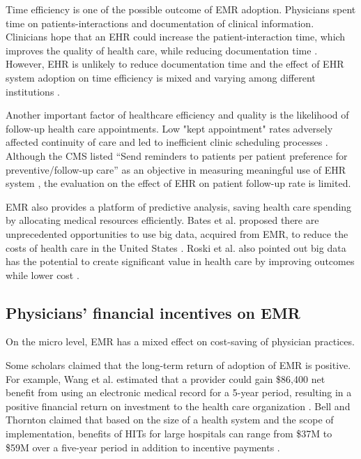Time efficiency is one of the possible outcome of EMR adoption. Physicians spent time on patients-interactions and documentation of clinical information. Clinicians hope that an EHR could increase the patient-interaction time, which improves the quality of health care, while reducing documentation time \citep{leung2003incentives}. However, EHR is unlikely to reduce documentation time \citep{poissant2005impact} and the effect of EHR system adoption on time efficiency is mixed and varying among different institutions \citep{Chaudhry2006}.

Another important factor of healthcare efficiency and quality is the likelihood of follow-up health care appointments. Low "kept appointment" rates adversely affected continuity of care and led to inefficient clinic scheduling processes \citep{myers2001strategies}. Although the CMS listed ``Send reminders to patients per patient preference for preventive/follow-up care'' as an objective in measuring meaningful use of EHR system \citep{cmsincentive14}, the evaluation on the effect of EHR on patient follow-up rate is limited.

EMR also provides a platform of predictive analysis, saving health care spending by allocating medical resources efficiently. Bates et al. proposed there are unprecedented opportunities to use big data, acquired from EMR, to reduce the costs of health care in the United States \citep{Bates2014}. Roski et al. also pointed out big data has the potential to create significant value in health care by improving outcomes while lower cost \citep{Roski2014}.

\subsection{Physicians' financial incentives on EMR}
On the micro level, EMR has a mixed effect on cost-saving of physician practices.

Some scholars claimed that the long-term return of adoption of EMR is positive. For example, Wang et al. estimated that a provider could gain \$86,400 net benefit from using an electronic medical record for a 5-year period, resulting in a positive financial return on investment to the health care organization \citep{Wang2003}. Bell and Thornton claimed that based on the size of a health system and the scope of implementation, benefits of HITs for large hospitals can range from \$37M to \$59M over a five-year period in addition to incentive payments \citep{Bell2011}.

